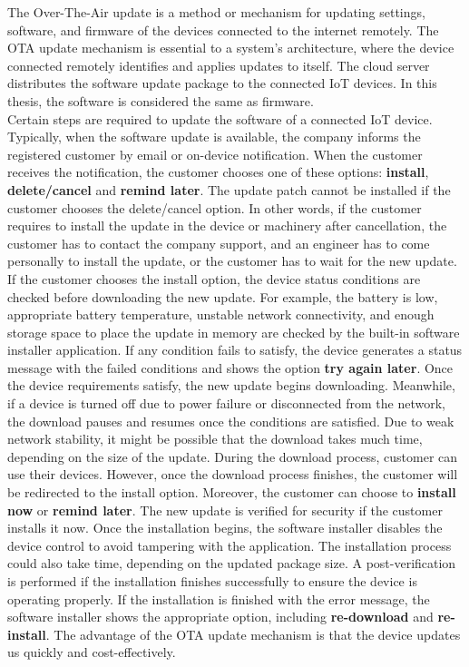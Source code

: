 \documentclass[12pt,a4paper]{article}
\begin{document}
The Over-The-Air update is a method or mechanism for updating settings, software, and firmware of the devices connected to the internet remotely. The OTA update mechanism is essential to a system's architecture, where the device connected remotely identifies and applies updates to itself. The cloud server distributes the software update package to the connected IoT devices. \cite{r5} In this thesis, the software is considered the same as firmware. \\

Certain steps are required to update the software of a connected IoT device. Typically, when the software update is available, the company informs the registered customer by email or on-device notification. When the customer receives the notification, the customer chooses one of these options: \textbf{install}, \textbf{delete/cancel} and \textbf{remind later}. The update patch cannot be installed if the customer chooses the delete/cancel option. In other words, if the customer requires to install the update in the device or machinery after cancellation, the customer has to contact the company support, and an engineer has to come personally to install the update, or the customer has to wait for the new update. If the customer chooses the install option, the device status conditions are checked before downloading the new update. For example, the battery is low, appropriate battery temperature, unstable network connectivity, and enough storage space to place the update in memory are checked by the built-in software installer application. If any condition fails to satisfy, the device generates a status message with the failed conditions and shows the option \textbf{try again later}. Once the device requirements satisfy, the new update begins downloading. Meanwhile, if a device is turned off due to power failure or disconnected from the network, the download pauses and resumes once the conditions are satisfied. Due to weak network stability, it might be possible that the download takes much time, depending on the size of the update. During the download process, customer can use their devices. However, once the download process finishes, the customer will be redirected to the install option. Moreover, the customer can choose to \textbf{install now} or \textbf{remind later}. The new update is verified for security if the customer installs it now. Once the installation begins, the software installer disables the device control to avoid tampering with the application. The installation process could also take time, depending on the updated package size. A post-verification is performed if the installation finishes successfully to ensure the device is operating properly. If the installation is finished with the error message, the software installer shows the appropriate option, including \textbf{re-download} and \textbf{re-install}. The advantage of the OTA update mechanism is that the device updates us quickly and cost-effectively. \cite{r6} \\
\end{document}
